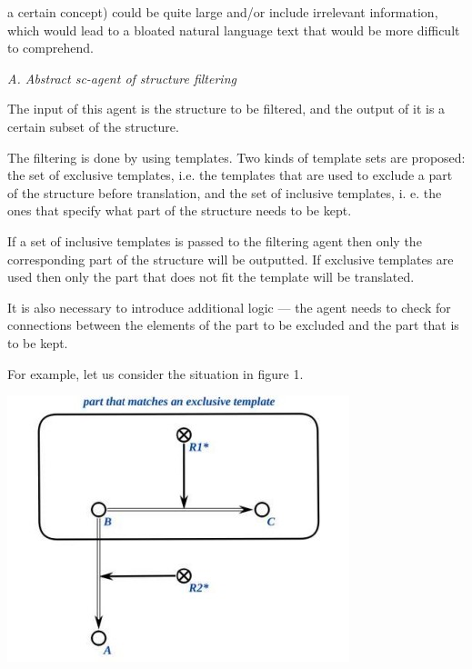 \documentclass{scndocument}
\begin{document}
\begin{SCn}
\begin{multicols}{2}
\begin{justify}
a certain concept) could be quite large and/or include
irrelevant information, which would lead to a bloated
natural language text that would be more difficult to
comprehend.\par
\end{justify}
\begin{flushleft}
\textit{A. Abstract sc-agent of structure filtering}
\end{flushleft}
\begin{justify}
\setlength{\parindent}{1em}
The input of this agent is the structure to be filtered, and the output of it is a certain subset of the structure.\par The filtering is done by using templates. Two kinds of template sets are proposed: the set of exclusive templates, i.e. the templates that are used to exclude a part of the structure before translation, and the set of inclusive templates, i. e. the ones that specify what part of the structure needs to be kept.\par If a set of inclusive templates is passed to the filtering agent then only the corresponding part of the structure will be outputted. If exclusive templates are used then only the part that does not fit the template will be translated.\par It is also necessary to introduce additional logic — the agent needs to check for connections between the elements of the part to be excluded and the part that is to be kept.\par 
For example, let us consider the situation in figure 1.
\end{justify}
\centering
\includegraphics[width=\linewidth]{zzzzzzzzzzzz.jpg}

\end{multicols}
\end{SCn}
\end{document}
